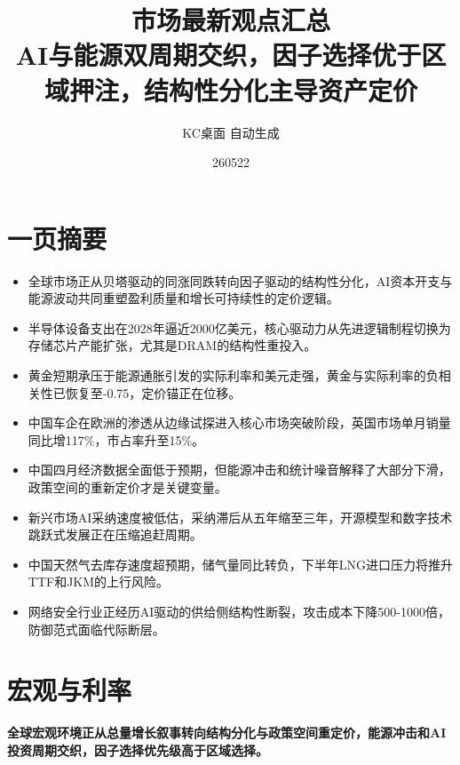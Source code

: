 \documentclass[11pt]{ctexart}
\title{\textbf{市场最新观点汇总}\\[0.4em]{\large AI与能源双周期交织，因子选择优于区域押注，结构性分化主导资产定价}}
\author{KC桌面 自动生成}
\date{260522}
\begin{document}
\maketitle
\section*{一页摘要}
\begin{itemize}
  \item 全球市场正从贝塔驱动的同涨同跌转向因子驱动的结构性分化，AI资本开支与能源波动共同重塑盈利质量和增长可持续性的定价逻辑。
  \item 半导体设备支出在2028年逼近2000亿美元，核心驱动力从先进逻辑制程切换为存储芯片产能扩张，尤其是DRAM的结构性重投入。
  \item 黄金短期承压于能源通胀引发的实际利率和美元走强，黄金与实际利率的负相关性已恢复至-0.75，定价锚正在位移。
  \item 中国车企在欧洲的渗透从边缘试探进入核心市场突破阶段，英国市场单月销量同比增117\%，市占率升至15\%。
  \item 中国四月经济数据全面低于预期，但能源冲击和统计噪音解释了大部分下滑，政策空间的重新定价才是关键变量。
  \item 新兴市场AI采纳速度被低估，采纳滞后从五年缩至三年，开源模型和数字技术跳跃式发展正在压缩追赶周期。
  \item 中国天然气去库存速度超预期，储气量同比转负，下半年LNG进口压力将推升TTF和JKM的上行风险。
  \item 网络安全行业正经历AI驱动的供给侧结构性断裂，攻击成本下降500-1000倍，防御范式面临代际断层。
\end{itemize}
\section{宏观与利率}
\textbf{全球宏观环境正从总量增长叙事转向结构分化与政策空间重定价，能源冲击和AI投资周期交织，因子选择优先级高于区域选择。}
\end{document}
